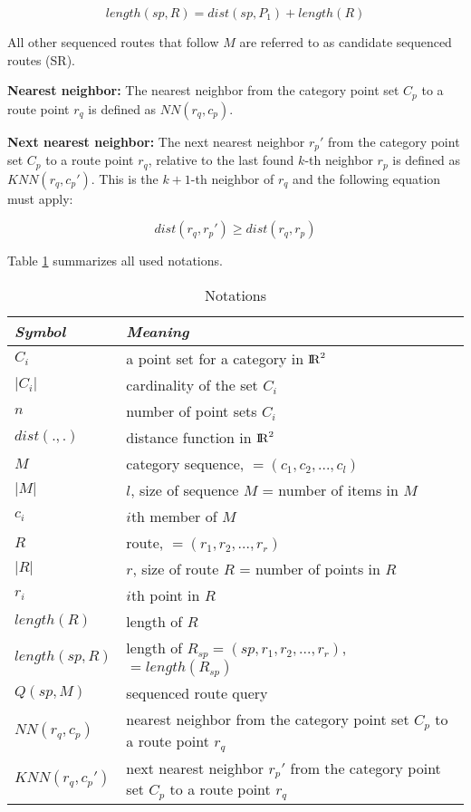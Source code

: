 \begin{equation}
length(sp, R) = dist(sp, P_1) + length(R)
\end{equation}

All other sequenced routes that follow $M$ are referred to as candidate sequenced routes (SR).

\textbf{Nearest neighbor:} The nearest neighbor from the category point set $C_p$ to a route point $r_q$ is defined as $NN(r_q, c_p)$.

\textbf{Next nearest neighbor:} The next nearest neighbor $r_p'$ from the category point set $C_p$ to a route point $r_q$, relative to the last found  $k$-th neighbor $r_p$ is defined as $KNN(r_q, c_p')$. This is the $k+1$-th neighbor of $r_q$ and the following equation must apply:

\begin{equation}
dist(r_q, r_p') \geq dist(r_q, r_p)
\end{equation} 

Table \ref{table} summarizes all used notations.

\enlargethispage{30pt}

\begin{table}[h!]
\centering
	\begin{tabular}{ |l|p{10cm}| } 
		\hline
		\textit{Symbol} & \textit{Meaning} \\
		\hline
		$C_i$ & a point set for a category in ${\rm I\!R}^2$ \\ 
		\hline
		$|C_i|$ & cardinality of the set $C_i$ \\ 
		\hline
		$n$ & number of point sets $C_i$ \\ 
		\hline
		$dist(., .)$ & distance function in ${\rm I\!R}^2$ \\ 
		\hline
		$M$ & category sequence, $=(c_1, c_2, ..., c_l)$ \\ 
		\hline
		$|M|$ & $l$, size of sequence $M$ = number of items in $M$ \\ 
		\hline
		$c_i$ & $i$th member of $M$ \\ 
		\hline
		$R$ & route, $= (r_1, r_2, ..., r_r)$ \\ 
		\hline
		$|R|$ & $r$, size of route $R$ = number of points in $R$ \\ 
		\hline
		$r_i$ & $i$th point in $R$ \\ 
		\hline
		$length(R)$ & length of $R$ \\ 
		\hline
		$length(sp, R)$ & length of $R_{sp} = (sp, r_1, r_2, ..., r_r)$, $= length(R_{sp})$ \\ 
		\hline
		$Q(sp, M)$ & sequenced route query \\ 
		\hline
		$NN(r_q, c_p)$ & nearest neighbor from the category point set $C_p$ to a route point $r_q$ \\ 
		\hline
		$KNN(r_q, c_p')$ & next nearest neighbor $r_p'$ from the category point set $C_p$ to a route point $r_q$ \\ 
		\hline
	\end{tabular}
\caption{Notations}
\label{table}
\end{table}





